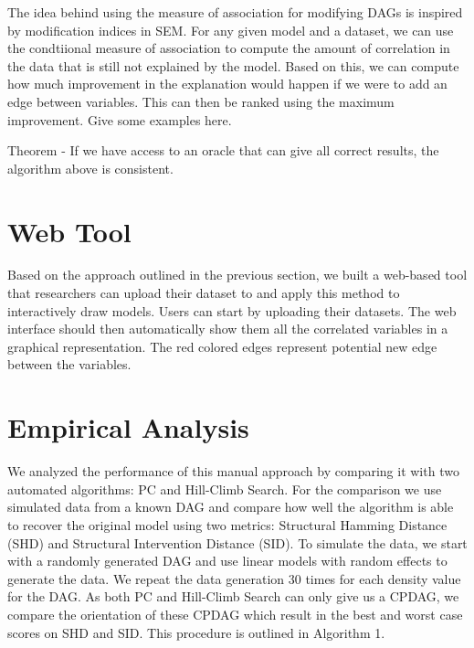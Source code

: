 \documentclass[letterpaper]{article} %
\begin{document}
The idea behind using the measure of association for modifying DAGs is inspired
by modification indices in SEM. For any given model and a dataset, we can use
the condtiional measure of association to compute the amount of correlation in
the data that is still not explained by the model. Based on this, we can
compute how much improvement in the explanation would happen if we were to add
an edge between variables. This can then be ranked using the maximum
improvement. Give some examples here.

Theorem - If we have access to an oracle that can give all correct results, 
the algorithm above is consistent.

\section{Web Tool}
\label{sec:web}
Based on the approach outlined in the previous section, we built a web-based
tool that researchers can upload their dataset to and apply this method to
interactively draw models. Users can start by uploading their datasets. The web
interface should then automatically show them all the correlated variables in a
graphical representation. The red colored edges represent potential new edge
between the variables.



\section{Empirical Analysis}
\label{sec:empirical}

We analyzed the performance of this manual approach by comparing it with two
automated algorithms: PC and Hill-Climb Search. For the comparison we use
simulated data from a known DAG and compare how well the algorithm is able to
recover the original model using two metrics: Structural Hamming Distance (SHD)
and Structural Intervention Distance (SID). To simulate the data, we start with
a randomly generated DAG and use linear models with random effects to generate
the data. We repeat the data generation $ 30 $ times for each density value for
the DAG. As both PC and Hill-Climb Search can only give us a CPDAG, we compare
the orientation of these CPDAG which result in the best and worst case scores
on SHD and SID. This procedure is outlined in Algorithm 1.
\end{document}
